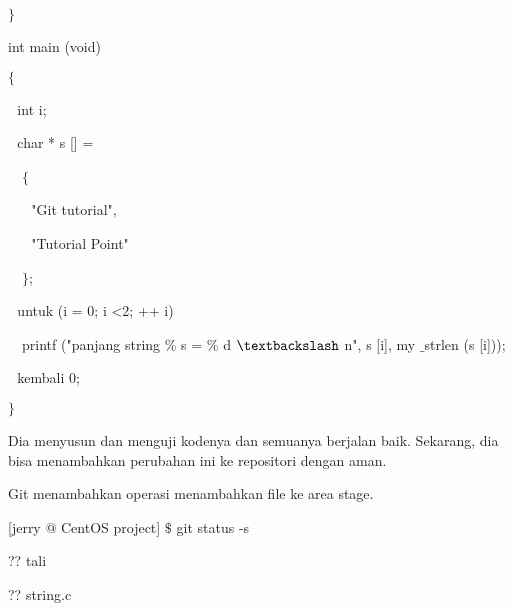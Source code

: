 \noindent 
 \hspace*{0.5in}  $  \}  $ \par
\noindent 
 \hspace*{0.5in} int main (void) \par
\noindent 
 \hspace*{0.5in}  $  \{  $ \par
\noindent 
 \hspace*{0.5in}  $  $ $  $ $  $int i; \par
\noindent 
 \hspace*{0.5in}  $  $ $  $ $  $char * s [] = \par
\noindent 
 \hspace*{0.5in}  $  $ $  $ $  $ $  \{  $ \par
\noindent 
 \hspace*{0.5in}  $  $ $  $ $  $ $  $ $  $ $  $"Git tutorial", \par
\noindent 
 \hspace*{0.5in}  $  $ $  $ $  $ $  $ $  $ $  $"Tutorial Point" \par
\noindent 
 \hspace*{0.5in}  $  $ $  $ $  $ $  \}  $; \par
\noindent 
 \hspace*{0.5in}  $  $ $  $ $  $untuk (i = 0; i <2; ++ i) $  $ $  $ $  $ $  $ $  $ $  $ \par
\noindent 
 $  $ $  $ $  $ \hspace*{0.5in} printf ("panjang string $  \%  $ s = $  \%  $ d  $  \textbackslash  $ n", s [i], my $  \_  $strlen (s [i])); \par
\noindent 
 \hspace*{0.5in}  $  $ $  $ $  $kembali 0; \par
\noindent 
 \hspace*{0.5in}  $  \}  $ \par
\noindent 
Dia menyusun dan menguji kodenya dan semuanya berjalan baik. Sekarang, dia bisa menambahkan perubahan ini ke repositori dengan aman. \par
\noindent 
Git menambahkan operasi menambahkan file ke area stage. \par
\noindent 
 \hspace*{0.5in} [jerry @ CentOS project]  $  \$  $ git status -s \par
\noindent 
 \hspace*{0.5in} ?? tali \par
\noindent 
 \hspace*{0.5in} ?? string.c \par
